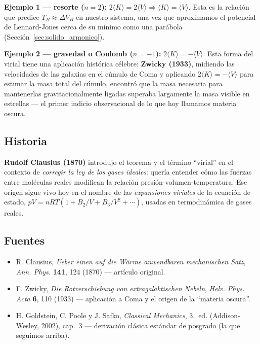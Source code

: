 \documentclass[11pt,a4paper]{article}
\begin{document}
\textbf{Ejemplo 1 --- resorte ($n=2$):} $2\langle K\rangle=2\langle V\rangle
\Rightarrow \langle K\rangle=\langle V\rangle$. Esta es la relación que
predice $T_B\approx\Delta V_B$ en nuestro sistema, una vez que aproximamos
el potencial de Lennard-Jones cerca de su mínimo como una parábola
(Sección~\ref{sec:solido_armonico}).

\textbf{Ejemplo 2 --- gravedad o Coulomb ($n=-1$):}
$2\langle K\rangle=-\langle V\rangle$. Esta forma del virial tiene una
aplicación histórica célebre: \textbf{Zwicky (1933)}, midiendo las
velocidades de las galaxias en el cúmulo de Coma y aplicando
$2\langle K\rangle=-\langle V\rangle$ para estimar la masa total del
cúmulo, encontró que la masa necesaria para mantenerlas gravitacionalmente
ligadas superaba largamente la masa visible en estrellas --- el primer
indicio observacional de lo que hoy llamamos materia oscura.

\subsection{Historia}

\textbf{Rudolf Clausius (1870)} introdujo el teorema y el término
``virial'' en el contexto de \emph{corregir la ley de los gases ideales}:
quería entender cómo las fuerzas entre moléculas reales modifican la
relación presión-volumen-temperatura. Ese origen sigue vivo hoy en el
nombre de las \emph{expansiones viriales} de la ecuación de estado,
$pV = nRT(1 + B_2/V + B_3/V^2 + \cdots)$, usadas en termodinámica de gases
reales.

\subsection{Fuentes}
\begin{itemize}[leftmargin=1.4em]
\item R. Clausius, \textit{Ueber einen auf die Wärme anwendbaren
mechanischen Satz}, \textit{Ann. Phys.} \textbf{141}, 124 (1870) ---
artículo original.
\item F. Zwicky, \textit{Die Rotverschiebung von extragalaktischen Nebeln},
\textit{Helv. Phys. Acta} \textbf{6}, 110 (1933) --- aplicación a Coma y
el origen de la ``materia oscura''.
\item H. Goldstein, C. Poole y J. Safko, \textit{Classical Mechanics},
3.\ ed. (Addison-Wesley, 2002), cap.~3 --- derivación clásica estándar de
posgrado (la que seguimos arriba).
\end{itemize}
\end{document}

